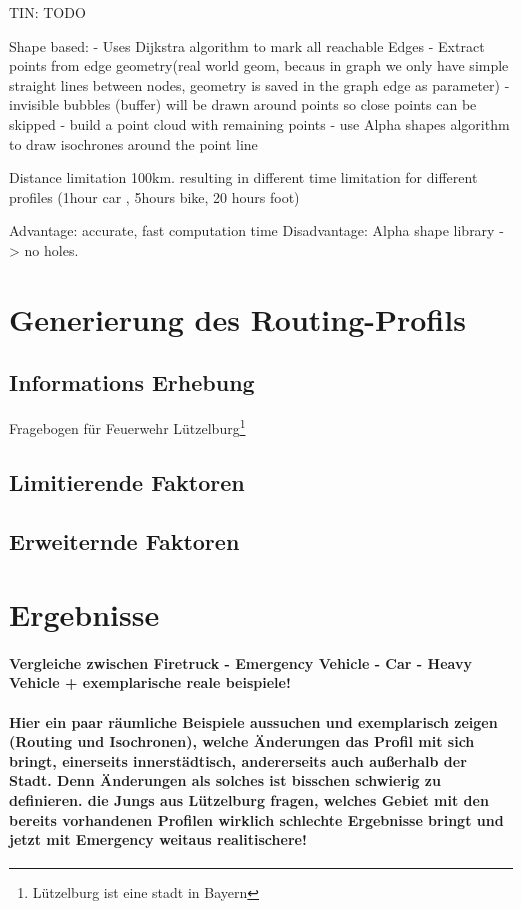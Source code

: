 \documentclass[10pt,a4paper]{article}
\begin{document}
TIN:
TODO

Shape based:
- Uses Dijkstra algorithm to mark all reachable Edges
- Extract points from edge geometry(real world geom, becaus in graph we only have simple straight lines between nodes, geometry is saved in the graph edge as parameter)
- invisible bubbles (buffer) will be drawn around points so close points can be skipped
- build a point cloud with remaining points
- use Alpha shapes algorithm to draw isochrones around the point line

 Distance limitation 100km. resulting in different time limitation for different profiles (1hour car , 5hours bike, 20 hours foot)

Advantage: accurate, fast computation time
Disadvantage: Alpha shape library -> no holes.



\section{Generierung des Routing-Profils}

\subsection{Informations Erhebung}
Fragebogen für Feuerwehr Lützelburg\footnote{Lützelburg ist eine stadt in Bayern}

\subsection{Limitierende Faktoren}

\subsection{Erweiternde Faktoren}

\section{Ergebnisse}
\paragraph{
Vergleiche zwischen Firetruck - Emergency Vehicle - Car - Heavy Vehicle
+ exemplarische reale beispiele!
}
\paragraph{
\color{red}
Hier ein paar räumliche Beispiele aussuchen und exemplarisch zeigen (Routing und Isochronen), welche Änderungen das Profil mit sich bringt, einerseits innerstädtisch, andererseits auch außerhalb der Stadt. Denn Änderungen als solches ist bisschen schwierig zu definieren. die Jungs aus Lützelburg fragen, welches Gebiet mit den bereits vorhandenen Profilen wirklich schlechte Ergebnisse bringt und jetzt mit Emergency weitaus realitischere!
}
\end{document}
